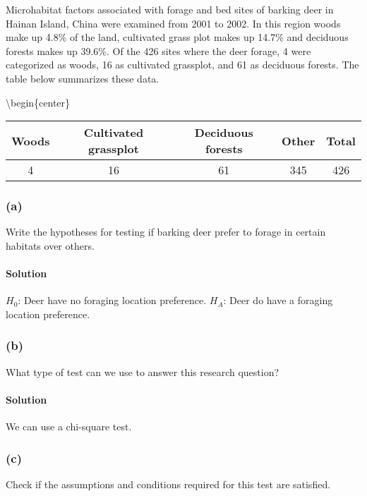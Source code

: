 \documentclass[]{article}
\let\oldparagraph\paragraph
\renewcommand{\paragraph}[1]{\oldparagraph{#1}\mbox{}}
\begin{document}
Microhabitat factors associated with forage and bed sites of barking
deer in Hainan Island, China were examined from 2001 to 2002. In this
region woods make up 4.8\% of the land, cultivated grass plot makes up
14.7\% and deciduous forests makes up 39.6\%. Of the 426 sites where the
deer forage, 4 were categorized as woods, 16 as cultivated grassplot,
and 61 as deciduous forests. The table below summarizes these data.

\textbackslash{}begin\{center\}

\begin{tabular}{c c c c c} 
Woods   & Cultivated grassplot  & Deciduous forests  & Other & Total \\ 
\hline 
4       & 16                  & 61                 & 345   & 426 \\ 
\end{tabular}

\subsubsection{(a)}\label{a-2}

Write the hypotheses for testing if barking deer prefer to forage in
certain habitats over others.

\paragraph{Solution}\label{solution-10}

\(H_0\): Deer have no foraging location preference. \(H_A\): Deer do
have a foraging location preference.

\subsubsection{(b)}\label{b-2}

What type of test can we use to answer this research question?

\paragraph{Solution}\label{solution-11}

We can use a chi-square test.

\subsubsection{(c)}\label{c-1}

Check if the assumptions and conditions required for this test are
satisfied.
\end{document}
